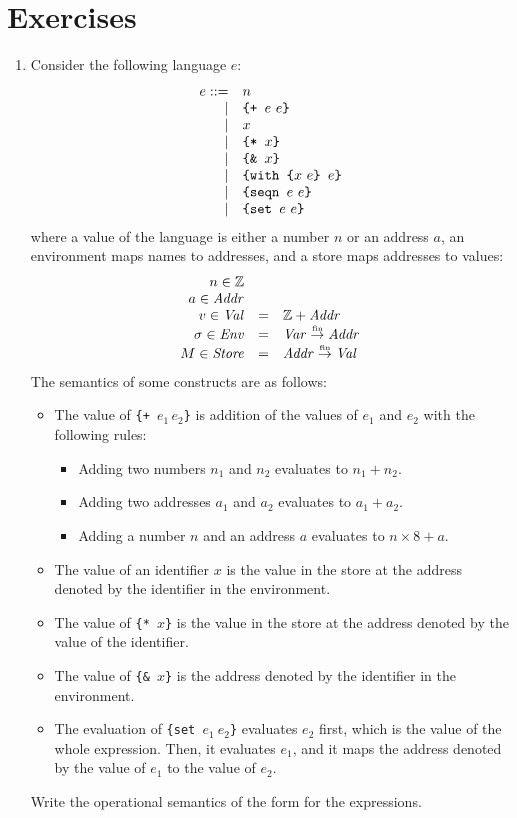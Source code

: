 \section{Exercises}

\begin{enumerate}
\item
Consider the following language $e$:
\[
\begin{array}{rll}
e ::= & n\\
\mid& \verb!{+ ! e\ e\verb+}+\\
\mid& x\\
\mid& \verb+{* +x\verb+}+\\
\mid& \verb+{& +x\verb+}+\\
\mid& \verb!{with {! x\ e\verb+} +e\verb+}+\\
\mid& \verb!{seqn ! e\ e\verb+}+\\
\mid& \verb!{set ! e\ e\verb+}+\\
\end{array}
\]
where a value of the language is either a number $n$ or an address $a$,
an environment maps names to addresses, and a store maps addresses to values:
\[
\begin{array}{rrl}
n \in \mathbb{Z}\\
a \in \mbox{\emph{Addr}}\\
v \in \mbox{\emph{Val}} & = & \mathbb{Z} + \mbox{\emph{Addr}}\\
\sigma \in \mbox{\emph{Env}} & = & \mbox{\emph{Var}} \stackrel{\mbox{\tiny fin}}{\to} \mbox{\emph{Addr}}\\
M \in \mbox{\emph{Store}} & = & \mbox{\emph{Addr}} \stackrel{\mbox{\tiny fin}}{\to} \mbox{\emph{Val}}
\end{array}
\]
The semantics of some constructs are as follows:
\begin{itemize}
\item The value of \verb!{+ !$e_1\,e_2$\verb!}! is addition of the values of $e_1$ and $e_2$ with the following rules:
\begin{itemize}
\item Adding two numbers $n_1$ and $n_2$ evaluates to $n_1+n_2$.
\item Adding two addresses $a_1$ and $a_2$ evaluates to $a_1+a_2$.
\item Adding a number $n$ and an address $a$ evaluates to $n \times 8 +a$.
\end{itemize}

\item The value of an identifier $x$ is the value in the store at the address denoted by the identifier in the environment.
\item The value of \verb+{* +$x$\verb+}+ is the value in the store at the address denoted by the value of the identifier.
\item The value of \verb+{& +$x$\verb+}+ is the address denoted by the identifier in the environment.
\item The evaluation of \verb+{set +$e_1\ e_2$\verb+}+ evaluates $e_2$ first, which is the value of the whole expression.  Then, it evaluates $e_1$, and it maps the address denoted by the value of $e_1$ to the value of $e_2$.
\end{itemize}
Write the operational semantics of the form  for the expressions.


\end{enumerate}
